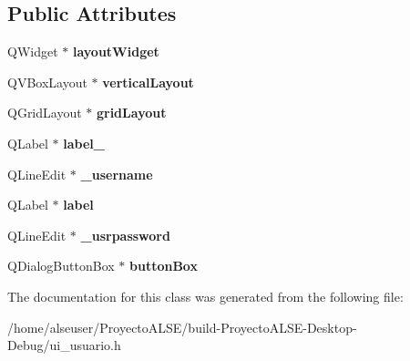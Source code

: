 \subsection*{Public Attributes}
\begin{DoxyCompactItemize}
\item 
\mbox{\label{class_ui__usuario_aaf194171c918371961f992de2c00f86f}} 
Q\+Widget $\ast$ {\bfseries layout\+Widget}
\item 
\mbox{\label{class_ui__usuario_a2eed23f73e18d74b1c9a781b93403e8f}} 
Q\+V\+Box\+Layout $\ast$ {\bfseries vertical\+Layout}
\item 
\mbox{\label{class_ui__usuario_a397af6bf8d0d140334c5f2641aa63e59}} 
Q\+Grid\+Layout $\ast$ {\bfseries grid\+Layout}
\item 
\mbox{\label{class_ui__usuario_a5232eaa606361b4df1c8e9874904b3b1}} 
Q\+Label $\ast$ {\bfseries label\+\_}
\item 
\mbox{\label{class_ui__usuario_ac8f8012f34f4cc089405da2f42e0a735}} 
Q\+Line\+Edit $\ast$ {\bfseries \+\_\+username}
\item 
\mbox{\label{class_ui__usuario_a24cc578c58c69b4d87e47987ce987d93}} 
Q\+Label $\ast$ {\bfseries label}
\item 
\mbox{\label{class_ui__usuario_a2ea3093be83b06be3870eb62e44cee9c}} 
Q\+Line\+Edit $\ast$ {\bfseries \+\_\+usrpassword}
\item 
\mbox{\label{class_ui__usuario_a09cb4e0570b5329c0554b076214b50d8}} 
Q\+Dialog\+Button\+Box $\ast$ {\bfseries button\+Box}
\end{DoxyCompactItemize}


The documentation for this class was generated from the following file\+:\begin{DoxyCompactItemize}
\item 
/home/alseuser/\+Proyecto\+A\+L\+S\+E/build-\/\+Proyecto\+A\+L\+S\+E-\/\+Desktop-\/\+Debug/ui\+\_\+usuario.\+h\end{DoxyCompactItemize}
